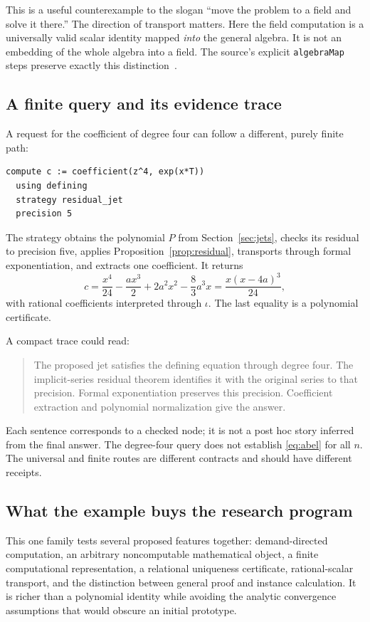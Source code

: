 \documentclass[11pt,a4paper]{article}
\newcommand{\code}[1]{\nolinkurl{#1}}
\theoremstyle{definition}
\begin{document}
This is a useful counterexample to the slogan ``move the problem to a field and solve it there.'' The direction of transport matters. Here the field computation is a universally valid scalar identity mapped \emph{into} the general algebra. It is not an embedding of the whole algebra into a field. The source's explicit \code{algebraMap} steps preserve exactly this distinction~\cite{pabel}.

\subsection{A finite query and its evidence trace}
A request for the coefficient of degree four can follow a different, purely finite path:
\par\noindent\begin{minipage}{\linewidth}
\begin{lstlisting}
compute c := coefficient(z^4, exp(x*T))
  using defining
  strategy residual_jet
  precision 5
\end{lstlisting}
\end{minipage}\par
The strategy obtains the polynomial \(P\) from Section~\ref{sec:jets}, checks its residual to precision five, applies Proposition~\ref{prop:residual}, transports through formal exponentiation, and extracts one coefficient. It returns
\[
           c=\frac{x^4}{24}-\frac{a x^3}{2}
                 +2a^2x^2-\frac83a^3x
             =\frac{x(x-4a)^3}{24},
\]
with rational coefficients interpreted through \(\iota\). The last equality is a polynomial certificate.

A compact trace could read:
\begin{quote}
The proposed jet satisfies the defining equation through degree four. The implicit-series residual theorem identifies it with the original series to that precision. Formal exponentiation preserves this precision. Coefficient extraction and polynomial normalization give the answer.
\end{quote}
Each sentence corresponds to a checked node; it is not a post hoc story inferred from the final answer. The degree-four query does not establish \eqref{eq:abel} for all \(n\). The universal and finite routes are different contracts and should have different receipts.

\subsection{What the example buys the research program}
This one family tests several proposed features together: demand-directed computation, an arbitrary noncomputable mathematical object, a finite computational representation, a relational uniqueness certificate, rational-scalar transport, and the distinction between general proof and instance calculation. It is richer than a polynomial identity while avoiding the analytic convergence assumptions that would obscure an initial prototype.
\end{document}
